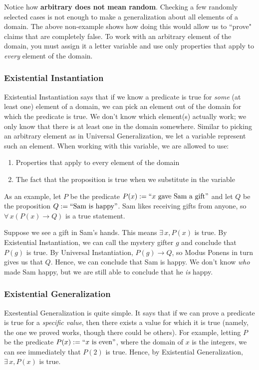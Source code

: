 \documentclass[11pt,oneside]{book}
\theoremstyle{definition}
\begin{document}
Notice how \textbf{arbitrary does not mean random}.
Checking a few randomly selected cases is not enough to make a generalization about all elements of a domain.
The above non-example shows how doing this would allow us to ``prove" claims that are completely false.
To work with an arbitrary element of the domain, you must assign it a letter variable and use only properties that apply to \emph{every} element of the domain.

\subsubsection*{Existential Instantiation}
Existential Instantiation says that if we know a predicate is true for \emph{some} (at least one) element of a domain, we can pick an element out of the domain for which the predicate is true.
We don't know which element(s) actually work; we only know that there is at least one in the domain somewhere.
Similar to picking an arbitrary element as in Universal Generalization, we let a variable represent such an element.
When working with this variable, we are allowed to use:

\begin{enumerate}
    \item Properties that apply to every element of the domain

    \item The fact that the proposition is true when we substitute in the variable
\end{enumerate}

As an example, let $P$ be the predicate $P(x) := ``x \text{ gave Sam a gift}"$ and let $Q$ be the proposition $Q := ``\text{Sam is happy}"$.
Sam likes receiving gifts from anyone, so $\forall\, x(P(x) \rightarrow Q)$ is a true statement.

Suppose we see a gift in Sam's hands.
This means $\exists\, x, P(x)$ is true.
By Existential Instantiation, we can call the mystery gifter $g$ and conclude that $P(g)$ is true.
By Universal Instantiation, $P(g) \rightarrow Q$, so Modus Ponens in turn gives us that $Q$.
Hence, we can conclude that Sam is happy.
We don't know \emph{who} made Sam happy, but we are still able to conclude that he \emph{is} happy.

\subsubsection*{Existential Generalization}
Exestential Generalization is quite simple.
It says that if we can prove a predicate is true for a \emph{specific value}, then there exists a value for which it is true (namely, the one we proved works, though there could be others).
For example, letting $P$ be the predicate $P(x) := ``x \text{ is even}"$, where the domain of $x$ is the integers, we can see immediately that $P(2)$ is true.
Hence, by Existential Generalization, $\exists\, x, P(x)$ is true.
\end{document}
